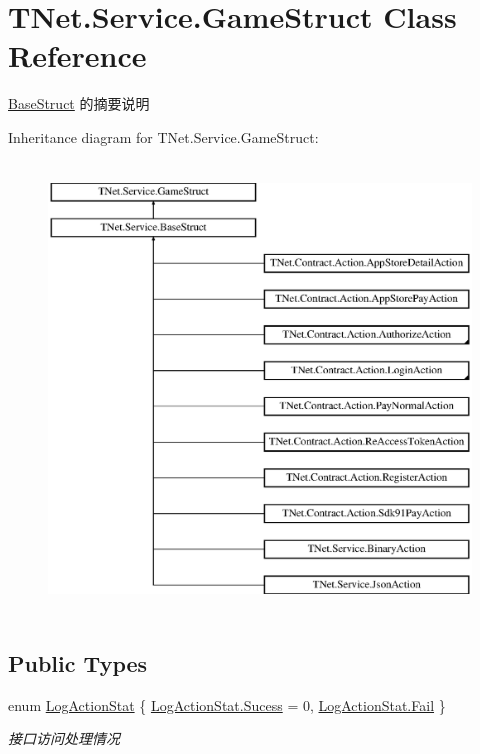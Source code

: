\hypertarget{class_t_net_1_1_service_1_1_game_struct}{}\section{T\+Net.\+Service.\+Game\+Struct Class Reference}
\label{class_t_net_1_1_service_1_1_game_struct}


\mbox{\hyperlink{class_t_net_1_1_service_1_1_base_struct}{Base\+Struct}} 的摘要说明  


Inheritance diagram for T\+Net.\+Service.\+Game\+Struct\+:\begin{figure}[H]
\begin{center}
\leavevmode
\includegraphics[height=12.000000cm]{class_t_net_1_1_service_1_1_game_struct}
\end{center}
\end{figure}
\subsection*{Public Types}
\begin{DoxyCompactItemize}
\item 
enum \mbox{\hyperlink{class_t_net_1_1_service_1_1_game_struct_ac7fb463ce72bdf0b12b015c74d2d58da}{Log\+Action\+Stat}} \{ \mbox{\hyperlink{class_t_net_1_1_service_1_1_game_struct_ac7fb463ce72bdf0b12b015c74d2d58daae86fe8e3ce45e5c58b6e88a15b0b8a0f}{Log\+Action\+Stat.\+Sucess}} = 0, 
\mbox{\hyperlink{class_t_net_1_1_service_1_1_game_struct_ac7fb463ce72bdf0b12b015c74d2d58daaceaa0734f0b3c738120c67344d8f3ec1}{Log\+Action\+Stat.\+Fail}}
 \}
\begin{DoxyCompactList}\small\item\em 接口访问处理情况 \end{DoxyCompactList}\end{DoxyCompactItemize}
